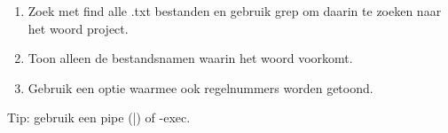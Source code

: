 \begin{enumerate}
\item Zoek met find alle .txt bestanden en gebruik grep om daarin te zoeken naar het woord project.
\item Toon alleen de bestandsnamen waarin het woord voorkomt.
\item Gebruik een optie waarmee ook regelnummers worden getoond.
\end{enumerate}

Tip: gebruik een pipe (|) of -exec.
